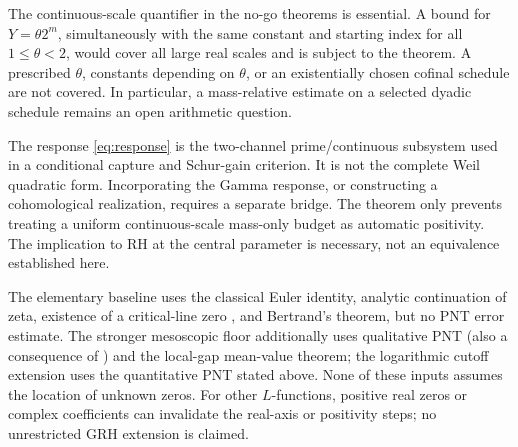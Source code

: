 \documentclass[11pt,a4paper]{article}
\theoremstyle{definition}
\theoremstyle{remark}
\begin{document}
The continuous-scale quantifier in the no-go theorems is essential.
A bound for \(Y=\theta2^m\), simultaneously with the same constant
and starting index for all \(1\le\theta<2\), would cover all large
real scales and is subject to the theorem.
A prescribed \(\theta\), constants depending on \(\theta\), or an
existentially chosen cofinal schedule are not covered.
In particular, a mass-relative estimate on a selected dyadic
schedule remains an open arithmetic question.

The response \eqref{eq:response} is the two-channel prime/continuous
subsystem used in a conditional capture and Schur-gain criterion.
It is not the complete Weil quadratic form. Incorporating the Gamma
response, or constructing a cohomological realization, requires a
separate bridge. The theorem only prevents treating a uniform
continuous-scale mass-only budget as automatic positivity.
The implication to RH at the central parameter is necessary, not
an equivalence established here.

The elementary baseline uses the classical Euler identity, analytic
continuation of zeta, existence of a critical-line zero
\cite{Hardy,DLMF}, and Bertrand's
theorem, but no PNT error estimate. The stronger mesoscopic floor
additionally uses qualitative PNT (also a consequence of \cite{FKS})
and the local-gap mean-value theorem;
the logarithmic cutoff extension uses the quantitative PNT stated above.
None of these inputs assumes the location of unknown zeros.
For other \(L\)-functions, positive real zeros or complex coefficients
can invalidate the real-axis or positivity steps; no unrestricted
GRH extension is claimed.
\end{document}
